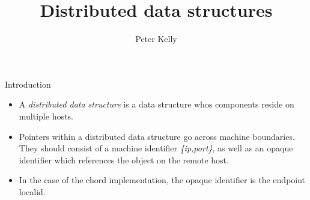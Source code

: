\documentclass[notes]{prosper}
\title{Distributed data structures}
\author{Peter Kelly}
\begin{document}
\begin{slide}{Introduction}
\begin{itemize}
\item
A \emph{distributed data structure} is a data structure whos components reside on
multiple hosts.

\item
Pointers within a distributed data structure go across machine boundaries. They
should consist of a machine identifier \emph{\{ip,port\}}, as well as an opaque identifier
which references the object on the remote host.

\item
In the case of the chord implementation, the opaque identifier is the endpoint
localid.

\end{itemize}

\end{slide}
\end{document}
